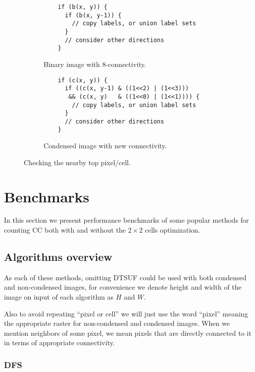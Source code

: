 \documentclass[hidelinks]{llncs}
\begin{document}
\begin{figure}
  \centering
  \begin{subfigure}[t]{0.475\linewidth}
    \centering
    \begin{lstlisting}
    if (b(x, y)) {
      if (b(x, y-1)) {
        // copy labels, or union label sets
      }
      // consider other directions
    }
    \end{lstlisting}
    \caption{Binary image with 8-connectivity.}
  \end{subfigure}
  \quad
  \begin{subfigure}[t]{0.475\linewidth}
    \centering
    \begin{lstlisting}
    if (c(x, y)) {
      if ((c(x, y-1) & ((1<<2) | (1<<3)))
       && (c(x, y)   & ((1<<0) | (1<<1)))) {
        // copy labels, or union label sets
      }
      // consider other directions
    }
    \end{lstlisting}
    \caption{Condensed image with new connectivity.}
  \end{subfigure}
  \caption{Checking the nearby top pixel/cell.}
  \label{fig:connectivity:code}
\end{figure}

\section{Benchmarks}

In this section we present performance benchmarks of some popular methods for
counting CC both with and without the $2 \times 2$ cells optimization.

\subsection{Algorithms overview}

As each of these methods, omitting DTSUF could be used with both condensed and
non-condensed images, for convenience we denote height and width of the image
on input of each algorithm as $H$ and $W$.

Also to avoid repeating ``pixel or cell'' we will just use the word ``pixel''
meaning the appropriate raster for non-condensed and condensed images.
When we mention neighbors of some pixel, we mean pixels that are directly
connected to it in terms of appropriate connectivity.

\subsubsection{DFS}
\end{document}
